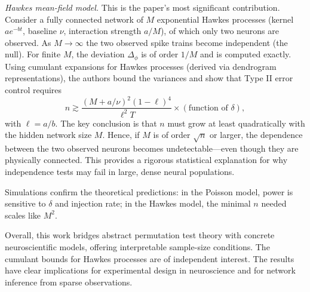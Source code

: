 \documentclass[11pt]{article}
\begin{document}
\textit{Hawkes mean-field model.} This is the paper's most significant contribution. Consider a fully connected network of $M$ exponential Hawkes processes (kernel $ae^{-bt}$, baseline $\nu$, interaction strength $a/M$), of which only two neurons are observed. As $M\to\infty$ the two observed spike trains become independent (the null). For finite $M$, the deviation $\Delta_\phi$ is of order $1/M$ and is computed exactly. Using cumulant expansions for Hawkes processes (derived via dendrogram representations), the authors bound the variances and show that Type II error control requires
$$
n \gtrsim \frac{(M + a/\nu)^2 (1-\ell)^4}{\ell^2 T} \times (\text{function of }\delta),
$$
with $\ell=a/b$. The key conclusion is that $n$ must grow at least quadratically with the hidden network size $M$. Hence, if $M$ is of order $\sqrt{n}$ or larger, the dependence between the two observed neurons becomes undetectable---even though they are physically connected. This provides a rigorous statistical explanation for why independence tests may fail in large, dense neural populations.

Simulations confirm the theoretical predictions: in the Poisson model, power is sensitive to $\delta$ and injection rate; in the Hawkes model, the minimal $n$ needed scales like $M^2$.

Overall, this work bridges abstract permutation test theory with concrete neuroscientific models, offering interpretable sample-size conditions. The cumulant bounds for Hawkes processes are of independent interest. The results have clear implications for experimental design in neuroscience and for network inference from sparse observations.
\end{document}

